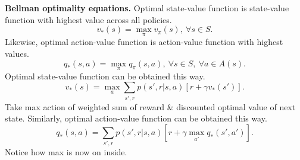 \documentclass{article}
\begin{document}
\begin{itemize}
\begin{itemize}
\begin{itemize}
            {\bf Bellman optimality equations.} Optimal state-value function is state-value function with highest value across all policies.
            \begin{equation*}
                v_*(s) = \max_\pi v_\pi(s),\ \forall s\in S.
            \end{equation*}
            Likewise, optimal action-value function is action-value function with highest values.
            \begin{equation*}
                q_*(s,a) = \max_\pi q_\pi(s,a),\ \forall s\in S,\ \forall a\in A(s).
            \end{equation*}
            Optimal state-value function can be obtained this way.
            \begin{equation*}
                v_*(s) = \max_a\sum_{s',r} p(s',r|s,a)[r + \gamma v_*(s')].
            \end{equation*}
            Take max action of weighted sum of reward \& discounted optimal value of next state. Similarly, optimal action-value function can be obtained this way.
            \begin{equation*}
                q_*(s,a) = \sum_{s',r} p(s',r|s,a)[r + \gamma\max_{a'} q_*(s',a')].
            \end{equation*}
            Notice how max is now on inside.


\end{itemize}
\end{itemize}
\end{itemize}
\end{document}
